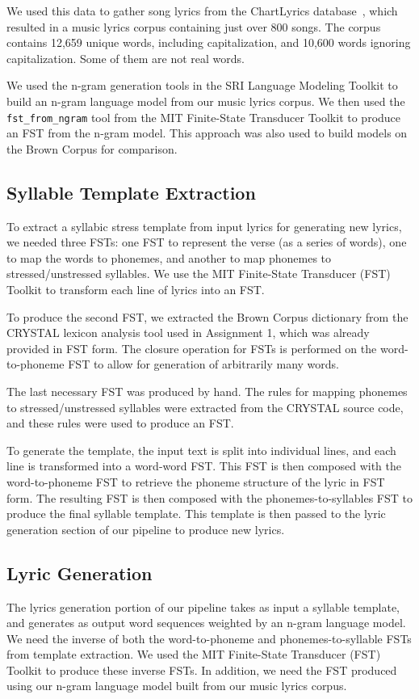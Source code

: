 \documentclass{vgtc}                          %
\begin{document}
We used this data to gather song lyrics from the ChartLyrics database~\cite{chartlyrics},
which resulted in a music lyrics corpus containing just over 800 songs. The corpus
contains 12,659 unique words, including capitalization, and 10,600 words
ignoring capitalization. Some of them are not real words.

We used the n-gram generation tools in the SRI Language Modeling Toolkit to build
an n-gram language model from our music lyrics corpus. We then used the
\texttt{fst\_from\_ngram} tool from
the MIT Finite-State Transducer Toolkit to produce
an FST from the n-gram model. This approach was also used to build
models on the Brown Corpus for comparison.

\subsection{Syllable Template Extraction}
To extract a syllabic stress template from input lyrics for generating
new lyrics, we needed three FSTs: one FST to represent the verse (as a series of words),
one to map the words to phonemes, and
another to map phonemes to stressed/unstressed syllables.
We use the MIT Finite-State Transducer (FST) Toolkit
to transform each line of lyrics into an FST.

To produce the second FST, we extracted
the Brown Corpus dictionary from the CRYSTAL lexicon
analysis tool used in Assignment 1, which was already
provided in FST form. The closure operation for FSTs
is performed on the word-to-phoneme FST to allow for
generation of arbitrarily many words.

The last necessary FST was produced by hand. The rules for mapping
phonemes to stressed/unstressed syllables
were extracted from the CRYSTAL source code, and these
rules were used to produce an FST.

To generate the template, the input text is split into individual lines, and
each line is transformed into a word-word FST.
This FST is then composed with the word-to-phoneme FST
to retrieve the phoneme structure of the lyric in FST
form. The resulting FST is then composed with the phonemes-to-syllables
FST to produce the final syllable template. This template is then
passed to the lyric generation section of our pipeline to produce
new lyrics.

\subsection{Lyric Generation}
The lyrics generation portion of our pipeline takes as input
a syllable template, and generates as output word sequences
weighted by an n-gram language model. We need the inverse
of both the word-to-phoneme and phonemes-to-syllable
FSTs from template extraction. We used the MIT Finite-State
Transducer (FST) Toolkit to produce these inverse FSTs.
In addition, we need the FST produced using our n-gram language
model built from our music lyrics corpus.
\end{document}
